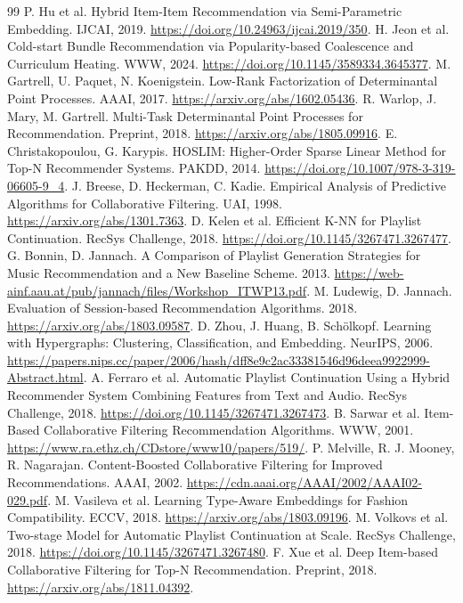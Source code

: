 \documentclass[11pt,a4paper]{article}
\begin{document}
\begin{thebibliography}{99}\small
{} P. Hu et al. Hybrid Item-Item Recommendation via Semi-Parametric
Embedding. IJCAI, 2019. \url{https://doi.org/10.24963/ijcai.2019/350}.
 H. Jeon et al. Cold-start Bundle Recommendation via
Popularity-based Coalescence and Curriculum Heating. WWW, 2024.
\url{https://doi.org/10.1145/3589334.3645377}.
 M. Gartrell, U. Paquet, N. Koenigstein. Low-Rank Factorization
of Determinantal Point Processes. AAAI, 2017.
\url{https://arxiv.org/abs/1602.05436}.
 R. Warlop, J. Mary, M. Gartrell. Multi-Task Determinantal Point
Processes for Recommendation. Preprint, 2018.
\url{https://arxiv.org/abs/1805.09916}.
 E. Christakopoulou, G. Karypis. HOSLIM: Higher-Order Sparse
Linear Method for Top-N Recommender Systems. PAKDD, 2014.
\url{https://doi.org/10.1007/978-3-319-06605-9_4}.
 J. Breese, D. Heckerman, C. Kadie. Empirical Analysis of
Predictive Algorithms for Collaborative Filtering. UAI, 1998.
\url{https://arxiv.org/abs/1301.7363}.
 D. Kelen et al. Efficient K-NN for Playlist Continuation.
RecSys Challenge, 2018. \url{https://doi.org/10.1145/3267471.3267477}.
 G. Bonnin, D. Jannach. A Comparison of Playlist Generation
Strategies for Music Recommendation and a New Baseline Scheme. 2013.
\url{https://web-ainf.aau.at/pub/jannach/files/Workshop_ITWP13.pdf}.
 M. Ludewig, D. Jannach. Evaluation of Session-based
Recommendation Algorithms. 2018. \url{https://arxiv.org/abs/1803.09587}.
 D. Zhou, J. Huang, B. Sch\"olkopf. Learning with Hypergraphs:
Clustering, Classification, and Embedding. NeurIPS, 2006.
\url{https://papers.nips.cc/paper/2006/hash/dff8e9c2ac33381546d96deea9922999-Abstract.html}.
 A. Ferraro et al. Automatic Playlist Continuation Using a
Hybrid Recommender System Combining Features from Text and Audio. RecSys
Challenge, 2018. \url{https://doi.org/10.1145/3267471.3267473}.
 B. Sarwar et al. Item-Based Collaborative Filtering Recommendation
Algorithms. WWW, 2001. \url{https://www.ra.ethz.ch/CDstore/www10/papers/519/}.
 P. Melville, R. J. Mooney, R. Nagarajan. Content-Boosted
Collaborative Filtering for Improved Recommendations. AAAI, 2002.
\url{https://cdn.aaai.org/AAAI/2002/AAAI02-029.pdf}.
 M. Vasileva et al. Learning Type-Aware Embeddings for Fashion
Compatibility. ECCV, 2018. \url{https://arxiv.org/abs/1803.09196}.
 M. Volkovs et al. Two-stage Model for Automatic Playlist
Continuation at Scale. RecSys Challenge, 2018.
\url{https://doi.org/10.1145/3267471.3267480}.
 F. Xue et al. Deep Item-based Collaborative Filtering for Top-N
Recommendation. Preprint, 2018. \url{https://arxiv.org/abs/1811.04392}.


\end{thebibliography}
\end{document}
